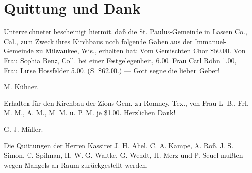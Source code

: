 \chapter{Quittung und Dank}

Unterzeichneter bescheinigt hiermit, daß die St. Paulus-Gemeinde in Lassen Co., Cal., zum Zweck ihres Kirchbaus noch folgende Gaben aus der Immanuel-Gemeinde zu Milwaukee, Wis., erhalten hat: Vom Gemischten Chor \$50.00. Von Frau Sophia Benz, Coll. bei einer Festgelegenheit, 6.00. Frau Carl Röhn 1.00, Frau Luise Hossfelder 5.00. (S. \$62.00.) — Gott segne die lieben Geber!

M. Kühner.

Erhalten für den Kirchbau der Zions-Gem. zu Romney, Tex., von Frau L. B., Frl. M. M., A. M., M. M. u. P. M. je \$1.00. Herzlichen Dank!

G. J. Müller.

Die Quittungen der Herren Kassirer J. H. Abel, C. A. Kampe, A. Roß, J. S. Simon, C. Spilman, H. W. G. Waltke, G. Wendt, H. Merz und P. Seuel mußten wegen Mangels an Raum zurückgestellt werden.
